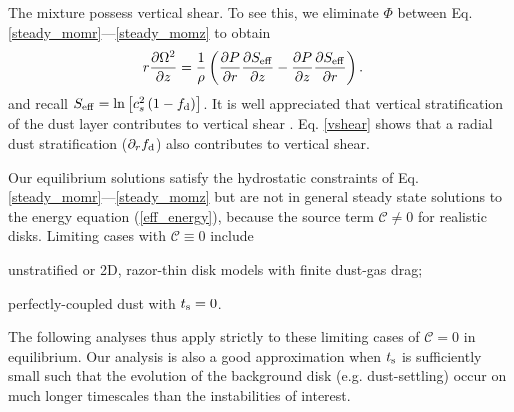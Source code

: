 The mixture possess vertical shear. To see this, we eliminate $\Phi$
between Eq. \ref{steady_momr}---\ref{steady_momz} to 
obtain 
\begin{align}\label{vshear}
  r\frac{\p \Omega^2}{\p z} 
   &= \frac{1}{\rho}\left(\frac{\p P}{\p r}\frac{\p \seff}{\p z} -\frac{\p
    P}{\p z}\frac{\p \seff}{\p r} \right).%
\end{align}
and recall $S_\mathrm{eff} = \ln{\left[c_s^2\left(1-f_\mathrm{d}\right)\right]}$. It is well appreciated that 
vertical stratification of the dust layer contributes to vertical shear
\citep{chiang08}. Eq. \ref{vshear} shows that a radial dust
stratification ($\partial_rf_\mathrm{d}$) also contributes to vertical shear.  



Our equilibrium solutions satisfy the hydrostatic constraints of
Eq. \ref{steady_momr}---\ref{steady_momz} but are not in general
steady state solutions to the energy 
equation (\ref{eff_energy}), because the source term $\mathcal{C} \ne0$ for realistic disks.  
Limiting cases with $\mathcal{C} \equiv 0$ include \begin{inparaenum}[1)] 
\item 
  unstratified or 2D, razor-thin disk models with finite dust-gas drag; %
\item 
  perfectly-coupled dust with $t_\mathrm{s}=0$. %
\end{inparaenum} 
The following analyses thus apply strictly to these limiting cases of
$\mathcal{C} = 0$ in equilibrium.  Our analysis is also a good approximation when 
$t_\mathrm{s}$ is sufficiently small such that the evolution of the background disk (e.g. dust-settling) 
occur on much longer timescales than the instabilities of interest.   








